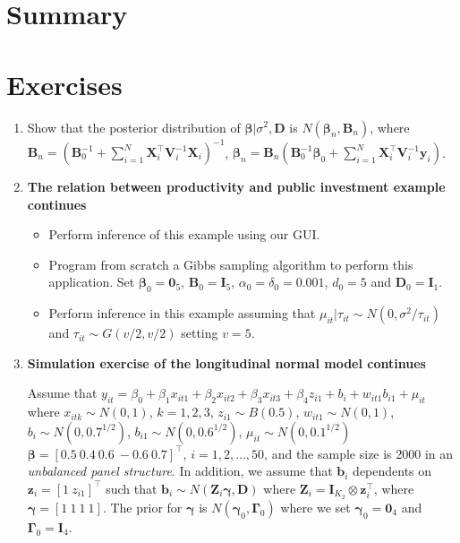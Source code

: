 \section{Summary}\label{sec94}

\section{Exercises}\label{sec95}

\begin{enumerate}
	
	\item Show that the posterior distribution of $\bm{\beta}|\sigma^2,\bm{D}$ is $N(\bm{\beta}_n,\bm{B}_n)$, where $\bm{B}_n = (\bm{B}_0^{-1} +\sum_{i=1}^N \bm{X}_i^{\top}\bm{V}_i^{-1}\bm{X}_i)^{-1}$, $\bm{\beta}_n= \bm{B}_n(\bm{B}_0^{-1}\bm{\beta}_0 + \sum_{i=1}^N\bm{X}_i^{\top}\bm{V}_i^{-1}\bm{y}_i)$.
	
	\item \textbf{The relation between productivity and public investment example continues}
	
	\begin{itemize}
		\item Perform inference of this example using our GUI.
		\item Program from scratch a Gibbs sampling algorithm to perform this application. Set $\bm{\beta}_0=\bm{0}_5$, $\bm{B}_0=\bm{I}_5$, $\alpha_0=\delta_0=0.001$, $d_0=5$ and $\bm{D}_0=\bm{I}_1$.
		\item Perform inference in this example assuming that $\mu_{it}|\tau_{it}\sim N(0, \sigma^2/\tau_{it})$ and $\tau_{it}\sim G(v/2,v/2)$ setting $v=5$. 
	\end{itemize}
  
	\item \textbf{Simulation exercise of the longitudinal normal model continues}
	
	
	Assume that $y_{it}=\beta_0+\beta_1x_{it1}+\beta_2x_{it2}+\beta_3x_{it3}+\beta_4 z_{i1}+b_i+w_{it1}b_{i1}+\mu_{it}$ where $x_{itk}\sim N(0,1)$, $k=1,2,3$, $z_{i1}\sim B(0.5)$, $w_{it1}\sim N(0,1)$, $b_i\sim N(0, 0.7^{1/2})$, $b_{i1}\sim N(0, 0.6^{1/2})$, $\mu_{it}\sim N(0, 0.1^{1/2})$ $\bm{\beta}=[0.5 \ 0.4 \ 0.6 \ -0.6 \ 0.7]^{\top}$, $i=1,2,\dots,50$, and the sample size is 2000 in an \textit{unbalanced panel structure}. In addition, we assume that $\bm{b}_i$ dependents on $\bm{z}_i=[1 \ z_{i1}]^{\top}$ such that $\bm{b}_i\sim N(\bm{Z}_i\bm{\gamma},\bm{D})$ where $\bm{Z}_i=\bm{I}_{K_2}\otimes \bm{z}_i^{\top}$, where $\bm{\gamma}=[1 \ 1 \ 1 \ 1]$. The prior for $\bm{\gamma}$ is $N(\bm{\gamma}_0,\bm{\Gamma}_0)$ where we set $\bm{\gamma}_0=\bm{0}_4$ and $\bm{\Gamma}_0=\bm{I}_4$. 
	

\end{enumerate}
